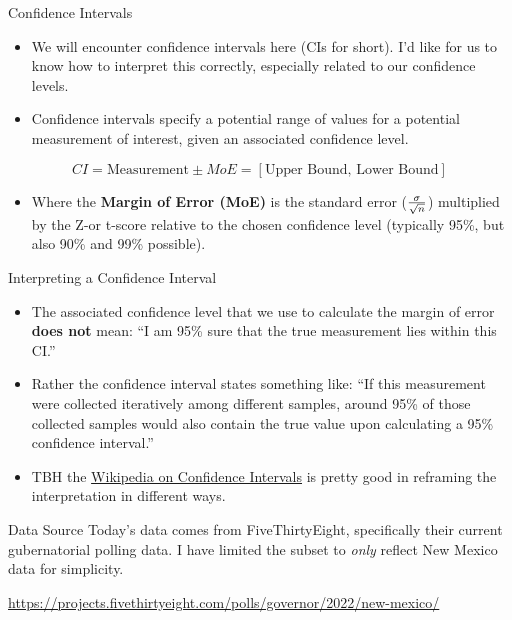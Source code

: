 \documentclass[
  ignorenonframetext,
]{beamer}
\providecommand{\tightlist}{%
  \setlength{\itemsep}{0pt}\setlength{\parskip}{0pt}}
\begin{document}
\begin{frame}{Confidence Intervals}
\protect\hypertarget{confidence-intervals}{}
\begin{itemize}
\item
  We will encounter confidence intervals here (CIs for short). I'd like
  for us to know how to interpret this correctly, especially related to
  our confidence levels.
\item
  Confidence intervals specify a potential range of values for a
  potential measurement of interest, given an associated confidence
  level.
\end{itemize}

\[CI = \text{Measurement} \pm MoE  = [\text{Upper Bound, Lower Bound}]\]

\begin{itemize}
\tightlist
\item
  Where the \textbf{Margin of Error (MoE)} is the standard error
  (\(\sigma\over\sqrt{n}\)) multiplied by the Z-or t-score relative to
  the chosen confidence level (typically 95\%, but also 90\% and 99\%
  possible).
\end{itemize}
\end{frame}

\begin{frame}{Interpreting a Confidence Interval}
\protect\hypertarget{interpreting-a-confidence-interval}{}
\begin{itemize}
\item
  The associated confidence level that we use to calculate the margin of
  error \textbf{does not} mean: ``I am 95\% sure that the true
  measurement lies within this CI.''
\item
  Rather the confidence interval states something like: ``If this
  measurement were collected iteratively among different samples, around
  95\% of those collected samples would also contain the true value upon
  calculating a 95\% confidence interval.''
\item
  TBH the
  \href{https://en.wikipedia.org/wiki/Confidence_interval}{Wikipedia on
  Confidence Intervals} is pretty good in reframing the interpretation
  in different ways.
\end{itemize}
\end{frame}

\begin{frame}{Data Source}
\protect\hypertarget{data-source}{}
Today's data comes from FiveThirtyEight, specifically their current
gubernatorial polling data. I have limited the subset to \emph{only}
reflect New Mexico data for simplicity.

\url{https://projects.fivethirtyeight.com/polls/governor/2022/new-mexico/}
\end{frame}
\end{document}
